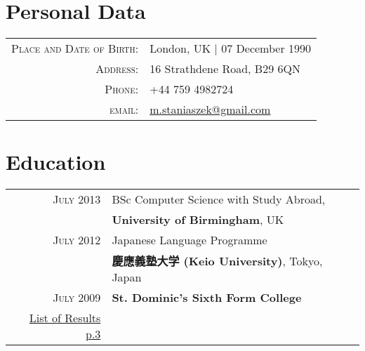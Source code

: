 \documentclass[a4paper,10pt]{article}
\begin{document}
\par{\bigskip\par}

\section{Personal Data}

\begin{tabular}{rl}
  \textsc{Place and Date of Birth:} & London, UK  | 07 December 1990 \\
  \textsc{Address:}   & 16 Strathdene Road, B29 6QN \\
  \textsc{Phone:}     & +44 759 4982724\\
  \textsc{email:}     & \href{mailto:m.staniaszek@gmail.com}{m.staniaszek@gmail.com}
\end{tabular}

\section{Education}
\begin{tabular}{rp{9cm}}
  \textsc{July} 2013 & BSc Computer Science with Study Abroad,\\ & \textbf{University of Birmingham}, UK\\
  \textsc{July} 2012 & Japanese Language Programme\\ & \textbf{慶應義塾大学 (Keio University)}, Tokyo, Japan\\
  \textsc{July} 2009& \textbf{St. Dominic's Sixth Form College}\\
  \hyperlink{bham_ug}{\hfill \footnotesize List of Results p.3}
\end{tabular}
\end{document}
